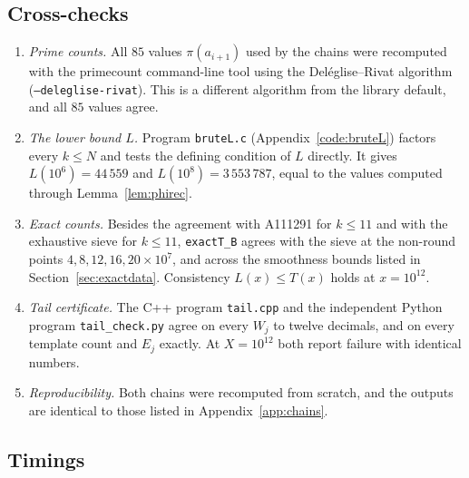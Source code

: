 \documentclass[11pt,a4paper]{article}
\theoremstyle{definition}
\begin{document}
\subsection{Cross-checks}\label{sec:crosscheck}

\begin{enumerate}
\item \emph{Prime counts.} All $85$ values $\pi(a_{i+1})$ used by the chains were recomputed with the primecount command-line tool using the Deléglise--Rivat algorithm (\texttt{--deleglise-rivat}). This is a different algorithm from the library default, and all $85$ values agree.
\item \emph{The lower bound $L$.} Program \texttt{bruteL.c} (Appendix~\ref{code:bruteL}) factors every $k\le N$ and tests the defining condition of $L$ directly. It gives $L(10^6)=44\,559$ and $L(10^8)=3\,553\,787$, equal to the values computed through Lemma~\ref{lem:phirec}.
\item \emph{Exact counts.} Besides the agreement with A111291 for $k\le11$ and with the exhaustive sieve for $k\le11$, \texttt{exactT\_B} agrees with the sieve at the non-round points $4,8,12,16,20\times10^{7}$, and across the smoothness bounds listed in Section~\ref{sec:exactdata}. Consistency $L(x)\le T(x)$ holds at $x=10^{12}$.
\item \emph{Tail certificate.} The C++ program \texttt{tail.cpp} and the independent Python program \texttt{tail\_check.py} agree on every $W_j$ to twelve decimals, and on every template count and $E_j$ exactly. At $X=10^{12}$ both report failure with identical numbers.
\item \emph{Reproducibility.} Both chains were recomputed from scratch, and the outputs are identical to those listed in Appendix~\ref{app:chains}.
\end{enumerate}

\subsection{Timings}\label{sec:timing}
\end{document}
